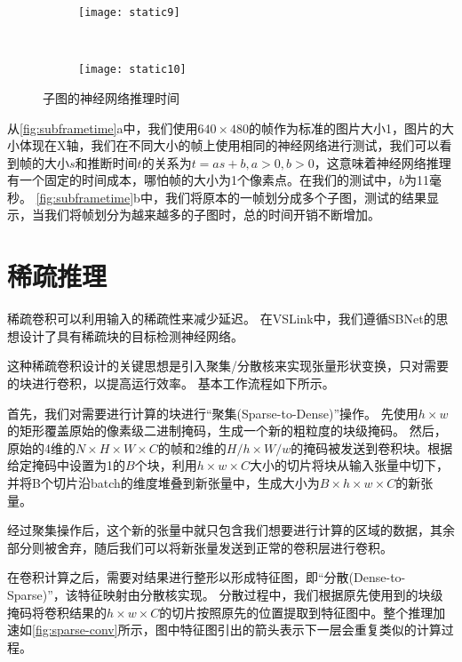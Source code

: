 \begin{figure}[htbp]
	\centering
	\begin{subfigure}{.48\linewidth}
		\texttt{[image: static9]}
		\caption{}
	\end{subfigure}
	\ 
	\begin{subfigure}{.48\linewidth}
		\texttt{[image: static10]}
		\caption{}
	\end{subfigure}
	\caption{子图的神经网络推理时间}\label{fig:subframetime}
\end{figure}

从\autoref{fig:subframetime}a中，我们使用$640\times 480$的帧作为标准的图片大小1，图片的大小体现在X轴，我们在不同大小的帧上使用相同的神经网络进行测试，我们可以看到帧的大小$s$和推断时间$t$的关系为$t = as + b, a>0,b >0$，这意味着神经网络推理有一个固定的时间成本，哪怕帧的大小为1个像素点。在我们的测试中，$b$为11毫秒。
\autoref{fig:subframetime}b中，我们将原本的一帧划分成多个子图，测试的结果显示，当我们将帧划分为越来越多的子图时，总的时间开销不断增加。

 
\section{稀疏推理}
稀疏卷积\cite{graham2015sparse,ren2018sbnet}可以利用输入的稀疏性来减少延迟。
在VSLink中，我们遵循SBNet\cite{ren2018sbnet}的思想设计了具有稀疏块的目标检测神经网络。

这种稀疏卷积设计\cite{ren2018sbnet}的关键思想是引入聚集/分散核来实现张量形状变换，只对需要的块进行卷积，以提高运行效率。
基本工作流程如下所示。

首先，我们对需要进行计算的块进行“聚集(Sparse-to-Dense)”操作。
先使用$h\times w$的矩形覆盖原始的像素级二进制掩码，生成一个新的粗粒度的块级掩码。
然后，原始的4维的$N \times H \times W \times C$的帧和2维的$H/h \times W/w$的掩码被发送到卷积块。根据给定掩码中设置为1的$B$个块，利用$h\times w \times C$大小的切片将块从输入张量中切下，并将B个切片沿batch的维度堆叠到新张量中，生成大小为$B\times h \times w \times C$的新张量。

经过聚集操作后，这个新的张量中就只包含我们想要进行计算的区域的数据，其余部分则被舍弃，随后我们可以将新张量发送到正常的卷积层进行卷积。

在卷积计算之后，需要对结果进行整形以形成特征图，即“分散(Dense-to-Sparse)”，该特征映射由分散核实现。
分散过程中，我们根据原先使用到的块级掩码将卷积结果的$h\times w \times C$的切片按照原先的位置提取到特征图中。整个推理加速如\autoref{fig:sparse-conv}所示，图中特征图引出的箭头表示下一层会重复类似的计算过程。


